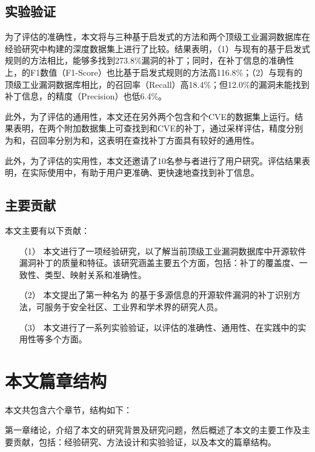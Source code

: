 \subsection{实验验证}
为了评估\tool 的准确性，本文将\tool 与三种基于启发式的方法和两个顶级工业漏洞数据库在经验研究中构建的深度数据集上进行了比较。结果表明，（1）与现有的基于启发式规则的方法相比，\tool 能够多找到273.8\%漏洞的补丁；同时，在补丁信息的准确性上，\tool 的F1数值（F1-Score）也比基于启发式规则的方法高116.8\%；（2）与现有的顶级工业漏洞数据库相比，\tool 的召回率（Recall）高18.4\%；但12.0\%的漏洞\tool 未能找到补丁信息，\tool 的精度（Precision）也低6.4\%。%

此外，为了评估\tool 的通用性，本文还在另外两个包含和个CVE的数据集上运行\tool 。结果表明，\tool 在两个附加数据集上可查找到和CVE的补丁，通过采样评估，精度分别为和，召回率分别为和，这表明\tool 在查找补丁方面具有较好的通用性。

此外，为了评估\tool 的实用性，本文还邀请了10名参与者进行了用户研究。评估结果表明，在实际使用中，\tool 有助于用户更准确、更快速地查找到补丁信息。

\subsection{主要贡献}
本文主要有以下贡献：
\begin{enumerate}
\item [（1）]本文进行了一项经验研究，以了解当前顶级工业漏洞数据库中开源软件漏洞补丁的质量和特征。该研究涵盖主要五个方面，包括：补丁的覆盖度、一致性、类型、映射关系和准确性。
\item [（2）]本文提出了第一种名为 \tool 的基于多源信息的开源软件漏洞的补丁识别方法，可服务于安全社区、工业界和学术界的研究人员。
\item [（3）]本文进行了一系列实验验证，以评估\tool 的准确性、通用性、在实践中的实用性等多个方面。
\end{enumerate}


\section{本文篇章结构}
本文共包含六个章节，结构如下：

第一章绪论，介绍了本文的研究背景及研究问题，然后概述了本文的主要工作及主要贡献，包括：经验研究、方法设计和实验验证，以及本文的篇章结构。

